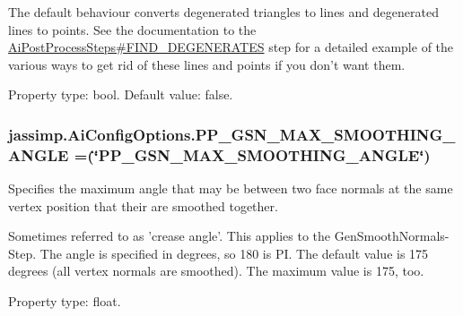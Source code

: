 The default behaviour converts degenerated triangles to lines and degenerated lines to points. See the documentation to the \hyperlink{enumjassimp_1_1_ai_post_process_steps_abf87e4bf911759a4141e5ba4596e29c1}{Ai\+Post\+Process\+Steps\#\+F\+I\+N\+D\+\_\+\+D\+E\+G\+E\+N\+E\+R\+A\+T\+E\+S} step for a detailed example of the various ways to get rid of these lines and points if you don't want them.

Property type\+: bool. Default value\+: false. \hypertarget{enumjassimp_1_1_ai_config_options_a3b3cd996c1201177c31ee7b2b697c4e1}{
\subsubsection[{P\+P\+\_\+\+G\+S\+N\+\_\+\+M\+A\+X\+\_\+\+S\+M\+O\+O\+T\+H\+I\+N\+G\+\_\+\+A\+N\+G\+L\+E}]{\setlength{\rightskip}{0pt plus 5cm}jassimp.\+Ai\+Config\+Options.\+P\+P\+\_\+\+G\+S\+N\+\_\+\+M\+A\+X\+\_\+\+S\+M\+O\+O\+T\+H\+I\+N\+G\+\_\+\+A\+N\+G\+L\+E =(\char`\"{}P\+P\+\_\+\+G\+S\+N\+\_\+\+M\+A\+X\+\_\+\+S\+M\+O\+O\+T\+H\+I\+N\+G\+\_\+\+A\+N\+G\+L\+E\char`\"{})}}\label{enumjassimp_1_1_ai_config_options_a3b3cd996c1201177c31ee7b2b697c4e1}
Specifies the maximum angle that may be between two face normals at the same vertex position that their are smoothed together.

Sometimes referred to as 'crease angle'. This applies to the Gen\+Smooth\+Normals-\/\+Step. The angle is specified in degrees, so 180 is P\+I. The default value is 175 degrees (all vertex normals are smoothed). The maximum value is 175, too.

Property type\+: float.

